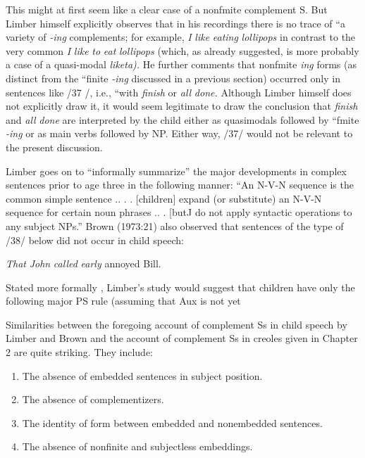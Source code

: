 This might at first seem like a clear case of a nonf{\textquotedbl}mite complement S. But Limber himself explicitly observes that in his recordings there is no trace of ``a variety of \textit{{}-ing} complements; for example, \textit{I} \textit{like} \textit{eating} \textit{lollipops} in contrast to the very common \textit{I} \textit{like} \textit{to} \textit{eat} \textit{lollipops{\textquotedbl}} (which, as already suggested, is more probably a case of a quasi-modal \textit{liketa).} He further comments that nonf{\textquotedbl}mite \textit{i}\textit{n}\textit{g} forms (as distinct from the ``finite \textit{{}-ing{\textquotedbl}} discussed in a previous section) occurred only in sentences like /37 /, i.e., ``with \textit{finish} or \textit{all} \textit{d}\textit{one.{\textquotedbl}} Although Limber himself does not explicitly draw it, it would seem legitimate to draw the conclusion that \textit{finish} and \textit{all} \textit{done} are interpreted by the child either as quasi\-modals followed by ``fmite \textit{{}-i}\textit{n}\textit{g{\textquotedbl}} or as main verbs followed by NP. Either way, /37/ would not be relevant to the present discussion.

Limber goes on to ``informally summarize'' the major develop\-ments in complex sentences prior to age three in the following manner: ``An N-V-N sequence is the common simple sentence .. . . [children] expand (or substitute) an N-V-N sequence for certain noun phrases .. .
[butJ do not apply syntactic operations to any subject NPs.'' Brown (1973:21) also observed that sentences of the type of /38/ below did not occur in child speech:

\ea\label{ex:38}
 \textit{That} \textit{John} \textit{called} \textit{early} annoyed Bill.
\glt
\z

Stated more formally , Limber's study would suggest that children have only the following major PS rule (assuming that Aux is not yet


Similarities between the foregoing account of complement Ss in child speech by Limber and Brown and the account of complement Ss in creoles given in Chapter 2 are quite striking. They include:


\begin{enumerate}
\item The absence of embedded sentences in subject position.
\item The absence of complementizers.
\item  The identity of form between embedded and nonembedded sentences.
\item The absence of nonfinite and subjectless embeddings.
\end{enumerate}



